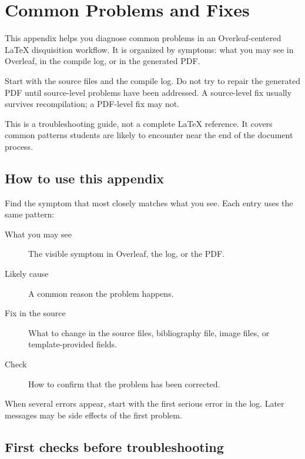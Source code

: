 
\chapter{Common Problems and Fixes}
\label{app:common-problems-fixes}

This appendix helps you diagnose common problems in an Overleaf-centered \LaTeX{} disquisition workflow. It is organized by symptoms: what you may see in Overleaf, in the compile log, or in the generated PDF.

Start with the source files and the compile log. Do not try to repair the generated PDF until source-level problems have been addressed. A source-level fix usually survives recompilation; a PDF-level fix may not.

This is a troubleshooting guide, not a complete \LaTeX{} reference. It covers common patterns students are likely to encounter near the end of the document process.

\section{How to use this appendix}
\label{sec:how-to-use-common-problems}

Find the symptom that most closely matches what you see. Each entry uses the same pattern:

\begin{description}
  \item[What you may see] The visible symptom in Overleaf, the log, or the PDF.
  \item[Likely cause] A common reason the problem happens.
  \item[Fix in the source] What to change in the source files, bibliography file, image files, or template-provided fields.
  \item[Check] How to confirm that the problem has been corrected.
\end{description}

When several errors appear, start with the first serious error in the log. Later messages may be side effects of the first problem.

\section{First checks before troubleshooting}
\label{sec:first-checks-before-troubleshooting}

